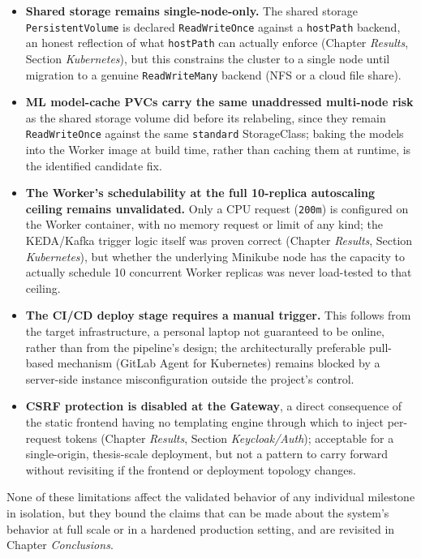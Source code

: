 \documentclass[twoside]{supsistudent}
\begin{document}
\begin{itemize}
    \item \textbf{Shared storage remains single-node-only.} The shared storage \texttt{PersistentVolume} is declared \texttt{ReadWriteOnce} against a \texttt{hostPath} backend, an honest reflection of what \texttt{hostPath} can actually enforce (Chapter \emph{Results}, Section \emph{Kubernetes}), but this constrains the cluster to a single node until migration to a genuine \texttt{ReadWriteMany} backend (NFS or a cloud file share).
    \item \textbf{ML model-cache PVCs carry the same unaddressed multi-node risk} as the shared storage volume did before its relabeling, since they remain \texttt{ReadWriteOnce} against the same \texttt{standard} StorageClass; baking the models into the Worker image at build time, rather than caching them at runtime, is the identified candidate fix.
    \item \textbf{The Worker's schedulability at the full 10-replica autoscaling ceiling remains unvalidated.} Only a CPU request (\texttt{200m}) is configured on the Worker container, with no memory request or limit of any kind; the KEDA/Kafka trigger logic itself was proven correct (Chapter \emph{Results}, Section \emph{Kubernetes}), but whether the underlying Minikube node has the capacity to actually schedule 10 concurrent Worker replicas was never load-tested to that ceiling.
    \item \textbf{The CI/CD deploy stage requires a manual trigger.} This follows from the target infrastructure, a personal laptop not guaranteed to be online, rather than from the pipeline's design; the architecturally preferable pull-based mechanism (GitLab Agent for Kubernetes) remains blocked by a server-side instance misconfiguration outside the project's control.
    \item \textbf{CSRF protection is disabled at the Gateway}, a direct consequence of the static frontend having no templating engine through which to inject per-request tokens (Chapter \emph{Results}, Section \emph{Keycloak/Auth}); acceptable for a single-origin, thesis-scale deployment, but not a pattern to carry forward without revisiting if the frontend or deployment topology changes.
\end{itemize}

None of these limitations affect the validated behavior of any individual milestone in isolation, but they bound the claims that can be made about the system's behavior at full scale or in a hardened production setting, and are revisited in Chapter \emph{Conclusions}.
\end{document}
